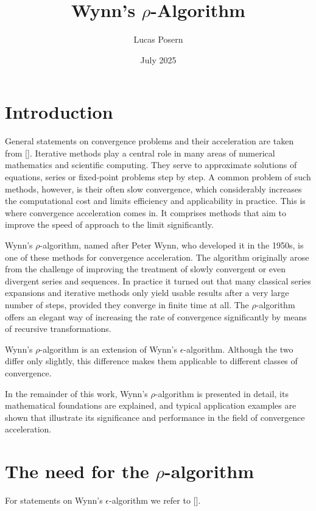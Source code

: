 \documentclass[a4paper,12pt]{article}
\title{{Wynn's $\rho$-Algorithm}}
\author{Lucas Posern}
\date{July 2025}
\numberwithin{equation}{section}
\theoremstyle{remark}
\begin{document}
\maketitle
\thispagestyle{empty}
\newpage
\thispagestyle{empty}
\tableofcontents
\newpage
{} %
\setcounter{page}{1}



\section{Introduction}\label{sec:einleitung}
General statements on convergence problems and their acceleration are taken from [\cite[194-199]{weniger1996nonlinear}].
Iterative methods play a central role in many areas of numerical mathematics and scientific computing. They serve to approximate solutions of equations, series or fixed-point problems step by step. A common problem of such methods, however, is their often slow convergence, which considerably increases the computational cost and limits efficiency and applicability in practice. This is where convergence acceleration comes in. It comprises methods that aim to improve the speed of approach to the limit significantly.

Wynn's $\rho$-algorithm, named after Peter Wynn, who developed it in the 1950s, is one of these methods for convergence acceleration. The algorithm originally arose from the challenge of improving the treatment of slowly convergent or even divergent series and sequences. In practice it turned out that many classical series expansions and iterative methods only yield usable results after a very large number of steps, provided they converge in finite time at all. The $\rho$-algorithm offers an elegant way of increasing the rate of convergence significantly by means of recursive transformations.

Wynn's $\rho$-algorithm is an extension of Wynn's $\epsilon$-algorithm. Although the two differ only slightly, this difference makes them applicable to different classes of convergence.

In the remainder of this work, Wynn's $\rho$-algorithm is presented in detail, its mathematical foundations are explained, and typical application examples are shown that illustrate its significance and performance in the field of convergence acceleration.

\section{The need for the $\rho$-algorithm}\label{sec:notwendigkeit}
For statements on Wynn's $\epsilon$-algorithm we refer to [\cite{wynn1966convergence}].\\
\end{document}
